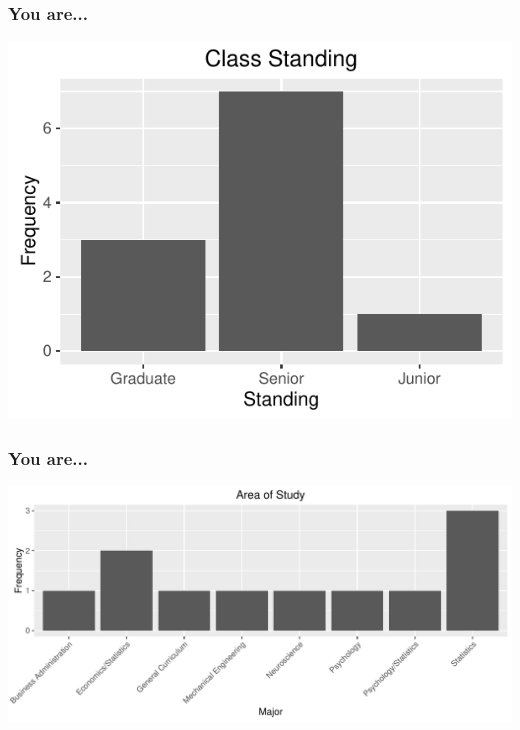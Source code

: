 \documentclass{beamer}\usepackage[]{graphicx}\usepackage[]{color}
\makeatletter
\def\maxwidth{ %
  \ifdim\Gin@nat@width>\linewidth
    \linewidth
  \else
    \Gin@nat@width
  \fi
}
\newenvironment{knitrout}{}{} %
\makeatother
\begin{document}
\begin{frame}[fragile]
\frametitle{You are... }



\begin{knitrout}
\color{fgcolor}

{\centering \includegraphics[width=\maxwidth]{figure/enrollment_level-1} 

}



\end{knitrout}

\end{frame}


\begin{frame}[fragile]
\frametitle{You are... }

\begin{knitrout}
\color{fgcolor}

{\centering \includegraphics[width=\maxwidth]{figure/enrollment_major-1} 

}



\end{knitrout}

\end{frame}
\end{document}
